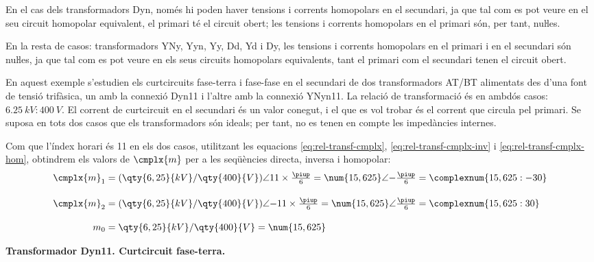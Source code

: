 En el cas dels transformadors Dyn, només hi poden haver tensions i corrents homopolars en el secundari, ja que tal com es pot veure en el seu circuit homopolar equivalent, el primari té el circuit obert; les tensions i corrents homopolars en el primari són, per tant, nuŀles.

En la resta de casos: transformadors YNy, Yyn, Yy, Dd, Yd i Dy, les tensions i corrents homopolars en el primari i en el secundari són  nuŀles, ja que tal com es pot veure en els seus circuits homopolars equivalents, tant el primari com el secundari tenen el circuit obert.


	
\begin{exemple}[\CCasimSecTrafo{}]\label{ex:IccTrafos}
	\addcontentsxms{\CCasimSecTrafo}
    En aquest exemple s'estudien els curtcircuits fase-terra i fase-fase en el secundari de dos transformadors AT/BT alimentats des d'una font de tensió trifàsica, un amb la connexió Dyn11 i l'altre amb la connexió YNyn11. La relació de transformació és en ambdós casos: $\qty{6,25}{kV}\!:\!\qty{400}{V}$. El corrent de curtcircuit en el secundari és un valor conegut, i el que es vol trobar és el corrent que circula pel primari. Se suposa en tots dos casos que els transformadors són ideals; per tant, no es tenen en compte les impedàncies internes.


    Com que l'índex horari és 11 en els dos casos, utilitzant les equacions \eqref{eq:rel-transf-cmplx}, \eqref{eq:rel-transf-cmplx-inv} i \eqref{eq:rel-transf-cmplx-hom}, obtindrem els valors de $\cmplx{m}$ per a les seqüències directa, inversa i homopolar:
    \begin{align*}
        \cmplx{m}_1 &= (\qty{6,25}{kV} / \qty{400}{V})\angle 11\times\tfrac{\piup}{6} =
        \num{15,625}\angle{-\tfrac{\piup}{6}} = \complexnum{15,625:-30} \\[1em]
        \cmplx{m}_2 &= (\qty{6,25}{kV} / \qty{400}{V})\angle {-11}\times\tfrac{\piup}{6} =
        \num{15,625}\angle \tfrac{\piup}{6} =\complexnum{15,625:30}  \\[1em]
        m_0 &= \qty{6,25}{kV} / \qty{400}{V} = \num{15,625}
    \end{align*}

	\break
   \textbf{ Transformador Dyn11. Curtcircuit fase-terra.}

    \begin{center}
       
    \end{center}


\end{exemple}
